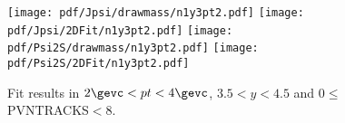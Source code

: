 \begin{figure}[H]
\begin{center}
\texttt{[image: pdf/Jpsi/drawmass/n1y3pt2.pdf]}
\texttt{[image: pdf/Jpsi/2DFit/n1y3pt2.pdf]}
\vspace*{-0.5cm}
\texttt{[image: pdf/Psi2S/drawmass/n1y3pt2.pdf]}
\texttt{[image: pdf/Psi2S/2DFit/n1y3pt2.pdf]}
\vspace*{-0.5cm}
\end{center}
\caption{Fit results in $2\gevc<pt<4\gevc$, $3.5<y<4.5$ and 0$\leq$PVNTRACKS$<$8.}
\label{Fitn1y3pt2}
\end{figure}
